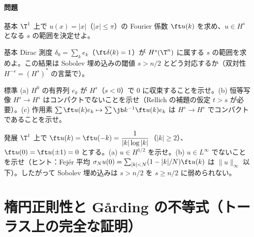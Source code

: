 \paragraph{問題}
\begin{prob}{基本}\label{p:absx}
$\T^1$ 上で $u(x)=|x|$（$|x|\le\pi$）の Fourier 係数 $\ft u(k)$ を求め、$u\in H^s$ となる $s$ の範囲を決定せよ。
\end{prob}
\begin{prob}{基本}\label{p:delta}
Dirac 測度 $\delta_0=\sum_ke_k$（$\ft\delta(k)=1$）が $H^s(\T^n)$ に属する $s$ の範囲を求めよ。この結果は Sobolev 埋め込みの閾値 $s>n/2$ とどう対応するか（双対性 $H^{-s}=(H^s)^*$ の言葉で）。
\end{prob}
\begin{prob}{標準}\label{p:rellichfail}
(a) $H^0$ の有界列 $e_k$ が $H^s$（$s<0$）で $0$ に収束することを示せ。(b) 恒等写像 $H^s\to H^s$ はコンパクトでないことを示せ（Rellich の補題の仮定 $t>s$ が必要）。(c) 作用素 $\sum\ft u(k)e_k\mapsto\sum\jb k^{-1}\ft u(k)e_k$ は $H^s\to H^s$ でコンパクトであることを示せ。
\end{prob}
\begin{prob}{発展}\label{p:H12}
$\T^1$ 上で $\ft u(k)=\ft u(-k)=\dfrac1{|k|\log|k|}$（$|k|\ge2$）、$\ft u(0)=\ft u(\pm1)=0$ とする。(a) $u\in H^{1/2}$ を示せ。(b) $u\in L^\infty$ でないことを示せ（ヒント：Fejér 平均 $\sigma_N u(0)=\sum_{|k|<N}(1-|k|/N)\ft u(k)$ は $\|u\|_\infty$ 以下）。したがって Sobolev 埋め込みは $s>n/2$ を $s\ge n/2$ に弱められない。
\end{prob}

\section{楕円正則性と Gårding の不等式（トーラス上の完全な証明）}\label{sec:reg}
